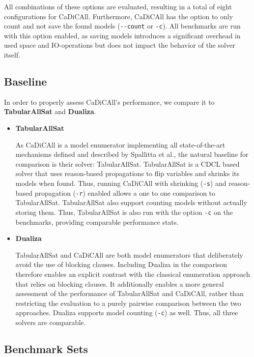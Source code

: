 \documentclass[12pt,a4paper]{article}
\begin{document}
All combinations of these options are evaluated, resulting in a total of eight configurations for CaDiCAll. Furthermore, CaDiCAll has the option to only count and not save the found models (\verb|--count| or \verb|-c|). All benchmarks are run with this option enabled, as saving models introduces a significant overhead in used space and IO-operations but does not impact the behavior of the solver itself.

\subsection{Baseline}

In order to properly assess CaDiCAll's performance, we compare it to \textbf{TabularAllSat} and \textbf{Dualiza}.

\begin{itemize}

\item \textbf{TabularAllSat}

As CaDiCAll is a model enumerator implementing all state-of-the-art mechanisms defined and described by Spallitta et al.\citep{Spallitta_Sebastiani_Biere_2024}, the natural baseline for comparison is their solver: TabularAllSat. TabularAllSat is a CDCL based solver that uses reason-based propagations to flip variables and shrinks its models when found. Thus, running CaDiCAll with shrinking (\verb|-s|) and reason-based propagation (\verb|-r|) enabled allows a one to one comparison to TabularAllSat. TabularAllSat also support counting models without actually storing them. Thus, TabularAllSat is also run with the option \verb|-c| on the benchmarks, providing comparable performance stats.

\item \textbf{Dualiza}

TabularAllSat and CaDiCAll are both model enumerators that deliberately avoid the use of blocking clauses. Including Dualiza in the comparison therefore enables an explicit contrast with the classical enumeration approach that relies on blocking clauses. It additionally enables a more general assessment of the performance of TabularAllSat and CaDiCAll, rather than restricting the evaluation to a purely pairwise comparison between the two approaches. Dualiza supports model counting (\verb|-c|) as well. Thus, all three solvers are comparable.

\end{itemize}

\subsection{Benchmark Sets}
\end{document}
